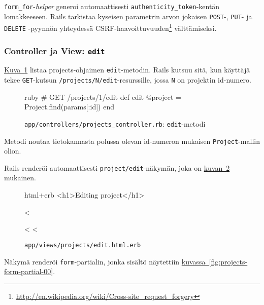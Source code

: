 \documentclass{article}
\newenvironment{myfigure}[1][tbp]{
  \begin{figure}[#1]
    \centering
    \begin{lrbox}{\myfigurebox}
      \begin{minipage}{\textwidth}
}{
      \end{minipage}
    \end{lrbox}
    \colorbox{blue!4}{\usebox{\myfigurebox}}
  \end{figure}
}
\newcommand{\myref}[2]{\hyperref[#2]{#1~\ref*{#2}}}
\newcommand{\pdfforeignlanguage}[2]{\texorpdfstring{\foreignlanguage{#1}{#2}}{#2}}
\newcommand{\eng}[1]{\pdfforeignlanguage{english}{#1}}
\begin{document}
\texttt{form\_for}-\emph{\eng{helper}} generoi automaattisesti
\texttt{authenticity\_token}-kentän lomakkeeseen. Rails tarkistaa kyseisen
parametrin arvon jokaisen \texttt{POST}-, \texttt{PUT}- ja \texttt{DELETE}
-pyynnön yhteydessä
CSRF-haavoittuvuuden\footnote{\url{http://en.wikipedia.org/wiki/Cross-site\_request\_forgery}}
välttämiseksi.

\subsubsection{\eng{Controller} ja \eng{View}: \texttt{edit}}

\begin{samepage}
\myref{Kuva}{fig:projects-controller-00-edit} listaa projects-ohjaimen
\texttt{edit}-metodin. Rails kutsuu sitä, kun käyttäjä tekee
\texttt{GET}-kutsun \texttt{/projects/N/edit}-resurssille, jossa \texttt{N} on
projektin id-numero.

\begin{myfigure}[H]
\caption{\texttt{app/controllers/projects\_controller.rb}:
\texttt{edit}-metodi}
\label{fig:projects-controller-00-edit}

\begin{pygmented}{ruby}
  # GET /projects/1/edit
  def edit
    @project = Project.find(params[:id])
  end
\end{pygmented}
\end{myfigure}
\end{samepage}

Metodi noutaa tietokannasta polussa olevan id-numeron mukaisen
\texttt{Project}-mallin olion.

\begin{samepage}
Rails renderöi automaattisesti \texttt{project/edit}-näkymän, joka on
\myref{kuvan}{fig:projects-edit-view-00} mukainen.

\begin{myfigure}[H]
\caption{\texttt{app/views/projects/edit.html.erb}}
\label{fig:projects-edit-view-00}

\begin{pygmented}{html+erb}
<h1>Editing project</h1>

<%

<%
<%
\end{pygmented}
\end{myfigure}
\end{samepage}

Näkymä renderöi \texttt{form}-partialin, jonka sisältö näytettiin
\myref{kuvassa}{fig:projects-form-partial-00}.
\end{document}
